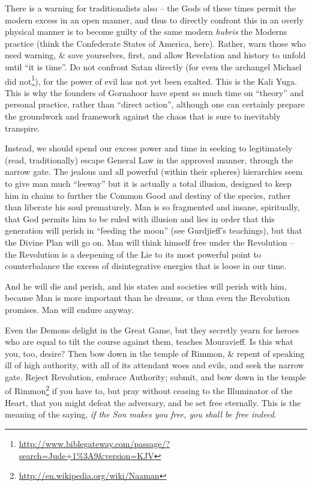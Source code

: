 There is a warning for traditionalists also -- the Gods of these times permit the modern excess in an open manner, and thus to directly confront this in an overly physical manner is to become guilty of the same modern \emph{hubris} the Moderns practice (think the Confederate States of America, here). Rather, warn those who need warning, \& save yourselves, first, and allow Revelation and history to unfold until ``it is time''. Do not confront Satan directly (for even the archangel Michael did not\footnote{\url{http://www.biblegateway.com/passage/?search=Jude+1\%3A9\&version=KJV}}), for the power of evil has not yet been exalted. This is the Kali Yuga. This is why the founders of Gornahoor have spent so much time on ``theory'' and personal practice, rather than ``direct action'', although one can certainly prepare the groundwork and framework against the chaos that is sure to inevitably transpire.

Instead, we should spend our excess power and time in seeking to legitimately (read, traditionally) escape General Law in the approved manner, through the narrow gate. The jealous and all powerful (within their spheres) hierarchies seem to give man much ``leeway'' but it is actually a total illusion, designed to keep him in chains to further the Common Good and destiny of the species, rather than liberate his soul prematurely. Man is so fragmented and insane, spiritually, that God permits him to be ruled with illusion and lies in order that this generation will perish in ``feeding the moon'' (see Gurdjieff's teachings), but that the Divine Plan will go on. Man will think himself free under the Revolution -- the Revolution is a deepening of the Lie to its most powerful point to counterbalance the excess of disintegrative energies that is loose in our time.

And he will die and perish, and his states and societies will perish with him, because Man is more important than he dreams, or than even the Revolution promises. Man will endure anyway.

Even the Demons delight in the Great Game, but they secretly yearn for heroes who are equal to tilt the course against them, teaches Mouravieff. Is this what you, too, desire? Then bow down in the temple of Rimmon, \& repent of speaking ill of high authority, with all of its attendant woes and evils, and seek the narrow gate. Reject Revolution, embrace Authority; submit, and bow down in the temple of Rimmon\footnote{\url{http://en.wikipedia.org/wiki/Naaman}} if you have to, but pray without ceasing to the Illuminator of the Heart, that you might defeat the adversary, and be set free eternally. This is the meaning of the saying, \emph{if the Son makes you free, you shall be free indeed}.

